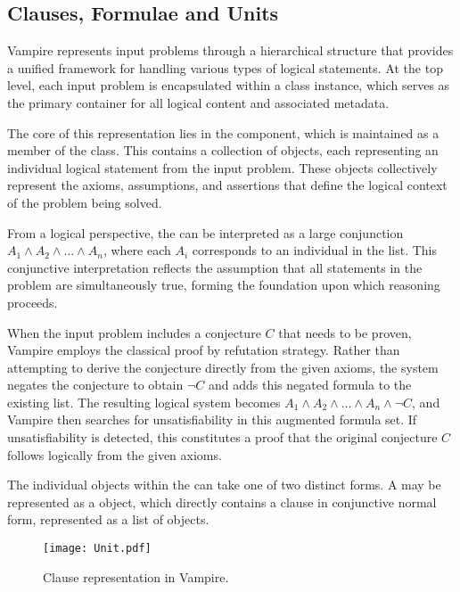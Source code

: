 \subsection{Clauses, Formulae and Units}\label{subsec:clauses-formulae-units}


Vampire represents input problems through a hierarchical structure that provides a unified framework for handling various types of logical statements.
At the top level, each input problem is encapsulated within a  class instance, which serves as the primary container for all logical content and associated metadata.

The core of this representation lies in the  component, which is maintained as a member of the  class.
This  contains a collection of  objects, each representing an individual logical statement from the input problem.
These  objects collectively represent the axioms, assumptions, and assertions that define the logical context of the problem being solved.

From a logical perspective, the  can be interpreted as a large conjunction \(A_1 \land A_2 \land \ldots \land A_n\), where each \(A_i\) corresponds to an individual  in the list.
This conjunctive interpretation reflects the assumption that all statements in the problem are simultaneously true, forming the foundation upon which reasoning proceeds.

When the input problem includes a conjecture \(C\) that needs to be proven, Vampire employs the classical proof by refutation strategy.
Rather than attempting to derive the conjecture directly from the given axioms, the system negates the conjecture to obtain \(\neg C\) and adds this negated formula to the existing  list.
The resulting logical system becomes \(A_1 \land A_2 \land \ldots \land A_n \land \neg C\), and Vampire then searches for unsatisfiability in this augmented formula set.
If unsatisfiability is detected, this constitutes a proof that the original conjecture \(C\) follows logically from the given axioms.

The individual  objects within the  can take one of two distinct forms.
A  may be represented as a  object, which directly contains a clause in conjunctive normal form, represented as a list of  objects.

\begin{figure}[H]
  \centering
  \texttt{[image: Unit.pdf]}
  \caption{Clause representation in Vampire.}\label{fig:clause-representation}
\end{figure}



